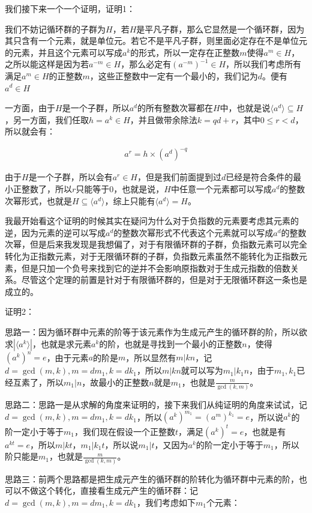 \documentclass[12pt, a4paper, oneside]{ctexart}
\theoremstyle{definition}
\begin{document}
我们接下来一个一个证明，证明1：

我们不妨记循环群的子群为$H$，若$H$是平凡子群，那么它显然是一个循环群，因为其只含有一个元素，就是单位元。若它不是平凡子群，则里面必定存在不是单位元的元素，并且这个元素可以写成$a^k$的形式，所以一定存在正整数$m$使得$a^m\in H$，之所以能这样是因为若$a^{-m}\in H$，那么必定有$(a^{-m})^{-1}\in H$，所以我们考虑所有满足$a^m\in H$的正整数$m$，这些正整数中一定有一个最小的，我们记为$d$。便有$a^d\in H$

一方面，由于$H$是一个子群，所以$a^d$的所有整数次幂都在$H$中，也就是说$\langle a^d\rangle\subseteq H$，另一方面，我们任取$h=a^k\in H$，并且做带余除法$k=qd+r$，其中$0\leqslant r <d$，所以就会有：

\begin{align*}
	a^r=h\times (a^d)^{-q}
\end{align*}

由于$H$是一个子群，所以会有$a^r\in H$，但是我们前面提到过$d$已经是符合条件的最小正整数了，所以$r$只能等于0，也就是说，$H$中任意一个元素都可以写成$a^d$的整数次幂形式，也就是$H\subseteq \langle a^d\rangle$，综上只能有$\langle a^d\rangle=H$。

我最开始看这个证明的时候其实在疑问为什么对于负指数的元素要考虑其元素的逆，因为元素的逆可以写成$a^d$的整数次幂形式不代表这个元素就可以写成$a^d$的整数次幂，但是后来我发现是我想偏了，对于有限循环群的子群，负指数元素可以完全转化为正指数元素，对于无限循环群的子群，负指数元素虽然不能转化为正指数元素，但是只加一个负号来找到它的逆并不会影响原指数对于生成元指数的倍数关系。尽管这个定理的前置是针对于有限循环群的，但是对于无限循环群这一条也是成立的。

证明2：

思路一：因为循环群中元素的阶等于该元素作为生成元产生的循环群的阶，所以欲求$|\langle a^k\rangle|$，也就是求元素$a^k$的阶，也就是寻找到一个最小的正整数$n$，使得$(a^k)^n=e$，由于元素$a$的阶是$m$，所以显然有$m|kn$，记$d=\gcd(m,k),m=dm_1,k=dk_1$，所以$m|kn$就可以写为$m_1|k_1n$，由于$m_1,k_1$已经互素了，所以$m_1|n$，故最小的正整数$n$就是$m_1$，也就是$\frac{m}{\gcd(k,m)}$。

思路二：思路一是从求解的角度来证明的，接下来我们从纯证明的角度来试试，记$d=\gcd(m,k),m=dm_1,k=dk_1$，所以$(a^k)^{m_1}=(a^m)^{k_1}=e$，所以说$a^k$的阶一定小于等于$m_1$，我们现在假设一个正整数$t$，满足$(a^k)^t=e$，也就是有$a^{kt}=e$，所以$m|kt$，$m_1|k_1t$，所以说$m_1|t$，又因为$a^k$的阶一定小于等于$m_1$，所以阶只能是$m_1$，也就是$\frac{m}{\gcd(k,m)}$。

思路三：前两个思路都是把生成元产生的循环群的阶转化为循环群中元素的阶，也可以不做这个转化，直接看生成元产生的循环群：记$d=\gcd(m,k),m=dm_1,k=dk_1$，我们考虑如下$m_1$个元素：
\end{document}

